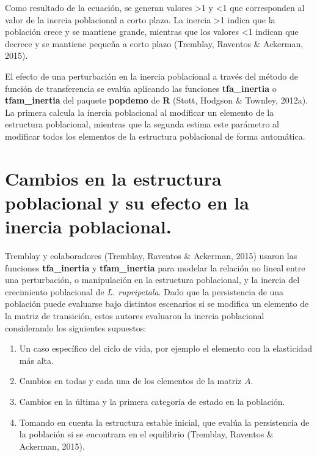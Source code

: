 \documentclass[
  12pt,
  letterpaper,
]{book}
\begin{document}
Como resultado de la ecuación, se generan valores \textgreater1 y
\textless1 que corresponden al valor de la inercia poblacional a corto
plazo. La inercia \textgreater1 indica que la población crece y se
mantiene grande, mientras que los valores \textless1 indican que decrece
y se mantiene pequeña a corto plazo (Tremblay, Raventos \& Ackerman,
2015).

El efecto de una perturbación en la inercia poblacional a través del
método de función de transferencia se evalúa aplicando las funciones
\textbf{tfa\_inertia} o \textbf{tfam\_inertia} del paquete
\textbf{popdemo} de \textbf{R} (Stott, Hodgson \& Townley, 2012a). La
primera calcula la inercia poblacional al modificar un elemento de la
estructura poblacional, mientras que la segunda estima este parámetro al
modificar todos los elementos de la estructura poblacional de forma
automática.

\section{Cambios en la estructura poblacional y su efecto en la inercia
poblacional.}\label{cambios-en-la-estructura-poblacional-y-su-efecto-en-la-inercia-poblacional.}

Tremblay y colaboradores (Tremblay, Raventos \& Ackerman, 2015) usaron
las funciones \textbf{tfa\_inertia} y \textbf{tfam\_inertia} para
modelar la relación no lineal entre una perturbación, o manipulación en
la estructura poblacional, y la inercia del crecimiento poblacional de
\emph{L. rupripetala}. Dado que la persistencia de una población puede
evaluarse bajo distintos escenarios si se modifica un elemento de la
matriz de transición, estos autores evaluaron la inercia poblacional
considerando los siguientes supuestos:

\begin{enumerate}
\def\labelenumi{\alph{enumi})}
\item
  Un caso específico del ciclo de vida, por ejemplo el elemento con la
  elasticidad más alta.
\item
  Cambios en todas y cada una de los elementos de la matriz \(A\).
\item
  Cambios en la última y la primera categoría de estado en la población.
\item
  Tomando en cuenta la estructura estable inicial, que evalúa la
  persistencia de la población si se encontrara en el equilibrio
  (Tremblay, Raventos \& Ackerman, 2015).
\end{enumerate}
\end{document}
